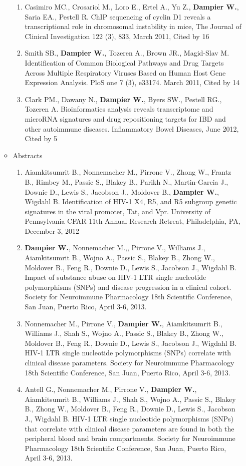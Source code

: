 \documentclass[a4paper,10pt]{article}
\begin{document}
\begin{enumerate}
\begin{itemize}
\begin{enumerate}[label=\arabic{enumii}.]
   \item Casimiro MC., Crosariol M., Loro E., Ertel A., Yu Z., \textbf{Dampier W.}, Saria EA., Pestell R. ChIP sequencing of cyclin D1 reveals a transcriptional role in chromosomal instability in mice, The Journal of Clinical Investigation 122 (3), 833, March 2011, Cited by 16
   \item Smith SB., \textbf{Dampier W.}, Tozeren A., Brown JR., Magid-Slav M. Identification of Common Biological Pathways and Drug Targets Across Multiple Respiratory Viruses Based on Human Host Gene Expression Analysis. PloS one 7 (3), e33174. March 2011, Cited by 14
   \item Clark PM., Dawany N., \textbf{Dampier W.}, Byers SW., Pestell RG., Tozeren A. Bioinformatics analysis reveals transcriptome and microRNA signatures and drug repositioning targets for IBD and other autoimmune diseases. Inflammatory Bowel Diseases, June 2012, Cited by 5
  \end{enumerate}
  \item[] Abstracts
  \begin{enumerate}[label=\arabic{enumii}.]
   \item Aiamkitsumrit B., Nonnemacher M., Pirrone V., Zhong W., Frantz B., Rimbey M., Passic S., Blakey B., Parikh N., Martin-Garcia J., Downie D., Lewis S., Jacobson J., Moldover B., \textbf{Dampier W.}, Wigdahl B. Identification of HIV-1 X4, R5, and R5 subgroup genetic signatures in the viral promoter, Tat, and Vpr. University of Pennsylvania CFAR 11th Annual Research Retreat, Philadelphia, PA, December 3, 2012
   \item \textbf{Dampier W.}, Nonnemacher M.,, Pirrone V., Williams J., Aiamkitsumrit B., Wojno A., Passic S., Blakey B., Zhong W., Moldover B., Feng R., Downie D., Lewis S., Jacobson J., Wigdahl B.  Impact of substance abuse on HIV-1 LTR single nucleotide polymorphisms (SNPs) and disease progression in a clinical cohort.  Society for Neuroimmune Pharmacology 18th Scientific Conference, San Juan, Puerto Rico, April 3-6, 2013.
   \item Nonnemacher M., Pirrone V., \textbf{Dampier W.}, Aiamkitsumrit B., Williams J., Shah S., Wojno A., Passic S., Blakey B., Zhong W., Moldover B., Feng R., Downie D., Lewis S., Jacobson J., Wigdahl B.  HIV-1 LTR single nucleotide polymorphisms (SNPs) correlate with clinical disease parameters. Society for Neuroimmune Pharmacology 18th Scientific Conference, San Juan, Puerto Rico, April 3-6, 2013.
   \item Antell G., Nonnemacher M., Pirrone V., \textbf{Dampier W.}, Aiamkitsumrit B., Williams J., Shah S., Wojno A., Passic S., Blakey B., Zhong W., Moldover B., Feng R., Downie D., Lewis S., Jacobson J., Wigdahl B.  HIV-1 LTR single nucleotide polymorphisms (SNPs) that correlate with clinical disease parameters are found in both the peripheral blood and brain compartments.  Society for Neuroimmune Pharmacology 18th Scientific Conference, San Juan, Puerto Rico, April 3-6, 2013.

\end{enumerate}
\end{itemize}
\end{enumerate}
\end{document}
